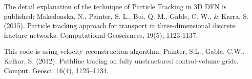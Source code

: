 The detail explanation of the technique of Particle Tracking in 3D D\+FN is published\+: Makedonska, N., Painter, S. L., Bui, Q. M., Gable, C. W., \& Karra, S. (2015). Particle tracking approach for transport in three-\/dimensional discrete fracture networks. Computational Geosciences, 19(5), 1123-\/1137.

This code is using velocity reconstruction algorithm\+: Painter, S.\+L., Gable, C.\+W., Kelkar, S. (2012). Pathline tracing on fully unstructured control-\/volume grids. Comput. Geosci. 16(4), 1125–1134. 